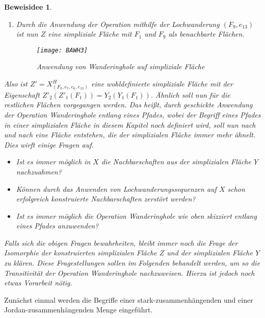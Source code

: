 \documentclass[12pt,titlepage,twoside,cleardoublepage]{article}
\theoremstyle{nummermitklammern}
\newtheorem{beweisidee}[temp]{Beweisidee}
\newtheorem{beweisidee}[zahl]{Beweisidee}
\numberwithin{equation}{section}
\begin{document}
\begin{beweisidee}
\begin{enumerate}
\item Durch die Anwendung der Operation mithilfe der Lochwanderung $(F_9,e_{13})$ ist nun $Z$ eine simpliziale Fläche mit $F_1$ und $F_9$ als benachbarte Flächen.
\begin{figure}[H]
\begin{center}
\texttt{[image: BAWH3]}
\end{center}
\caption{Anwendung von Wanderinghole auf simpliziale Fläche}
\end{figure}
\end{enumerate}
Also ist $Z'=X_{(F_9,e_7,e_6,e_{13})}^H$ eine wohldefinierte simpliziale Fläche mit der Eigenschaft $Z'_2(Z'_1(F_1))=Y_2(Y_1(F_1))$. Ähnlich soll nun für die restlichen Flächen vorgegangen werden. Das heißt, durch geschickte Anwendung der Operation Wanderinghole entlang eines Pfades, wobei der Begriff eines Pfades in einer simplizialen Fläche in diesem Kapitel noch definiert wird, soll nun nach und nach eine Fläche entstehen, die der simplizialen Fläche immer mehr ähnelt.\\
%
Dies wirft einige Fragen auf.
\begin{itemize}
\item Ist es immer möglich in $X$ die Nachbarschaften aus der simplizialen Fläche $Y$ nachzuahmen?
\item Können durch das Anwenden von Lochwanderungssequenzen auf $X$ schon erfolgreich konstruierte Nachbarschaften zerstört werden?
\item Ist es immer möglich die Operation Wanderinghole wie oben skizziert entlang eines Pfades anzuwenden? 
\end{itemize}
Falls sich die obigen Fragen bewahrheiten, bleibt immer noch die Frage der Isomorphie der konstruierten simplizialen Fläche $Z$ und der simplizialen Fläche $Y$ zu klären. Diese Fragestellungen sollen im Folgenden behandelt werden, um so die Transitivität der Operation Wanderinghole nachzuweisen. Hierzu ist jedoch noch etwas Vorarbeit nötig.
\end{beweisidee}
Zunächst einmal werden die Begriffe einer stark-zusammenhängenden und einer Jordan-zusammenhängenden Menge eingeführt.
\end{document}
